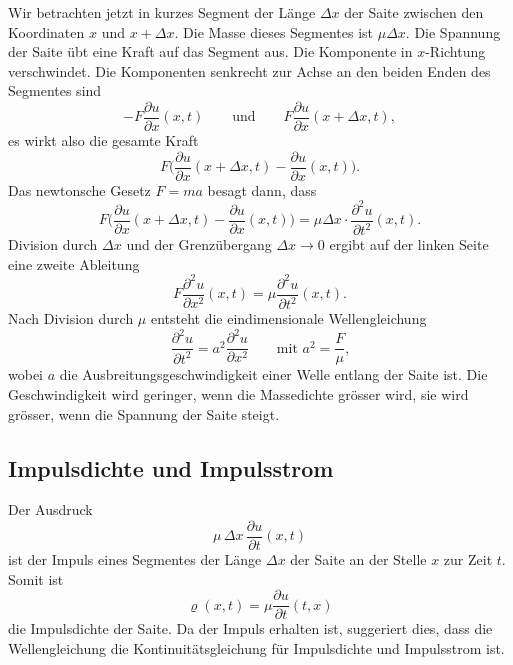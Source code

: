 Wir betrachten jetzt in kurzes Segment der Länge $\Delta x$ der Saite
zwischen den Koordinaten $x$ und $x+\Delta x$.
Die Masse dieses Segmentes ist $\mu \Delta x$.
Die Spannung der Saite übt eine Kraft auf das Segment aus.
Die Komponente in $x$-Richtung verschwindet.
Die Komponenten senkrecht zur Achse an den beiden 
Enden des Segmentes sind
\[
-F\frac{\partial u}{\partial x}(x,t)
\qquad\text{und}\qquad
F\frac{\partial u}{\partial x}(x+\Delta x,t),
\]
es wirkt also die gesamte Kraft
\[
F
\biggl(
\frac{\partial u}{\partial x}(x+\Delta x,t)
-
\frac{\partial u}{\partial x}(x,t)
\biggr).
\]
Das newtonsche Gesetz $F=ma$ besagt dann, dass
%
\[
F
\biggl(
\frac{\partial u}{\partial x}(x+\Delta x,t)
-
\frac{\partial u}{\partial x}(x,t)
\biggr)
=
\mu\Delta x\cdot \frac{\partial^2 u}{\partial t^2}(x,t).
\]
Division durch $\Delta x$ und der Grenzübergang $\Delta x\to 0$ ergibt
auf der linken Seite eine zweite Ableitung
\[
F
\frac{\partial^2u}{\partial x^2}(x,t)
=
\mu
\frac{\partial^2u}{\partial t^2}(x,t).
\]
Nach Division durch $\mu$ entsteht die eindimensionale Wellengleichung
%
\begin{equation}
\frac{\partial^2 u}{\partial t^2}
=
a^2
\frac{\partial^2 u}{\partial x^2}
\qquad\text{mit $a^2=\displaystyle\frac{F}{\mu}$,}
\label{buch:feldgleichungen:wellengleichung:eqn:wellengleichung}
\end{equation}
wobei $a$ die Ausbreitungsgeschwindigkeit einer Welle entlang der
Saite ist.
Die Geschwindigkeit wird geringer, wenn die Massedichte grösser wird,
sie wird grösser, wenn die Spannung der Saite steigt.

%
%
\subsection{Impulsdichte und Impulsstrom}
Der Ausdruck
\[
\mu \,\Delta x \,\frac{\partial u}{\partial t}(x,t)
\]
ist der Impuls eines Segmentes der Länge $\Delta x$ der Saite
an der Stelle $x$ zur Zeit $t$.
Somit ist
\[
\varrho(x,t)
=
\mu\frac{\partial u}{\partial t}(t,x)
\]
die Impulsdichte der Saite.
%
Da der Impuls erhalten ist, suggeriert dies, dass die Wellengleichung
die Kontinuitätsgleichung für Impulsdichte und Impulsstrom ist.

